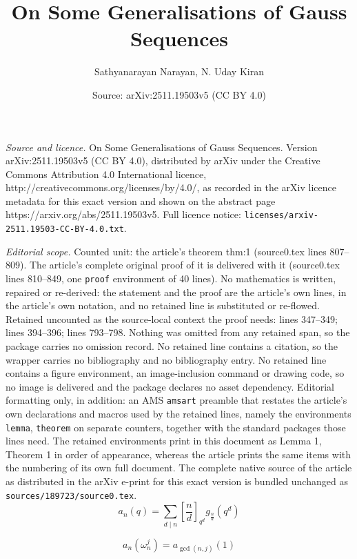 \documentclass[10pt,a4paper]{amsart}
\title{On Some Generalisations of Gauss Sequences}
\author{Sathyanarayan Narayan, N. Uday Kiran}
\date{Source: arXiv:2511.19503v5 (CC BY 4.0)}
\begin{document}
\maketitle

\noindent\emph{Source and licence.} On Some Generalisations of Gauss Sequences. Version arXiv:2511.19503v5 (CC BY 4.0), distributed by arXiv under the Creative Commons Attribution 4.0 International licence, http://creativecommons.org/licenses/by/4.0/, as recorded in the arXiv licence metadata for this exact version and shown on the abstract page https://arxiv.org/abs/2511.19503v5. Full licence notice: \texttt{licenses/arxiv-2511.19503-CC-BY-4.0.txt}.\par\smallskip

\noindent\textit{Editorial scope.} Counted unit: the article's theorem thm:1 (source0.tex lines 807--809). The article's complete original proof of it is delivered with it (source0.tex lines 810--849, one \texttt{proof} environment of 40 lines). No mathematics is written, repaired or re-derived: the statement and the proof are the article's own lines, in the article's own notation, and no retained line is substituted or re-flowed.  Retained uncounted as the source-local context the proof needs: lines 347--349; lines 394--396; lines 793--798.  Nothing was omitted from any retained span, so the package carries no omission record.  No retained line contains a citation, so the wrapper carries no bibliography and no bibliography entry.  No retained line contains a figure environment, an image-inclusion command or drawing code, so no image is delivered and the package declares no asset dependency.  Editorial formatting only, in addition: an AMS \texttt{amsart} preamble that restates the article's own declarations and macros used by the retained lines, namely the environments \texttt{lemma}, \texttt{theorem} on separate counters, together with the standard packages those lines need.  The retained environments print in this document as Lemma 1, Theorem 1 in order of appearance, whereas the article prints the same items with the numbering of its own full document.  The complete native source of the article as distributed in the arXiv e-print for this exact version is bundled unchanged as \texttt{sources/189723/source0.tex}.
\begin{equation}\label{eq:022}
a_n(q)=\sum_{d\mid n}\left[\frac{n}{d}\right]_{q^d}g_{\frac{n}{d}}(q^d)
\end{equation}

\begin{equation}\label{eq:011}
    a_n(\omega_n^j)=a_{\gcd(n,j)}(1)
\end{equation}
\end{document}
